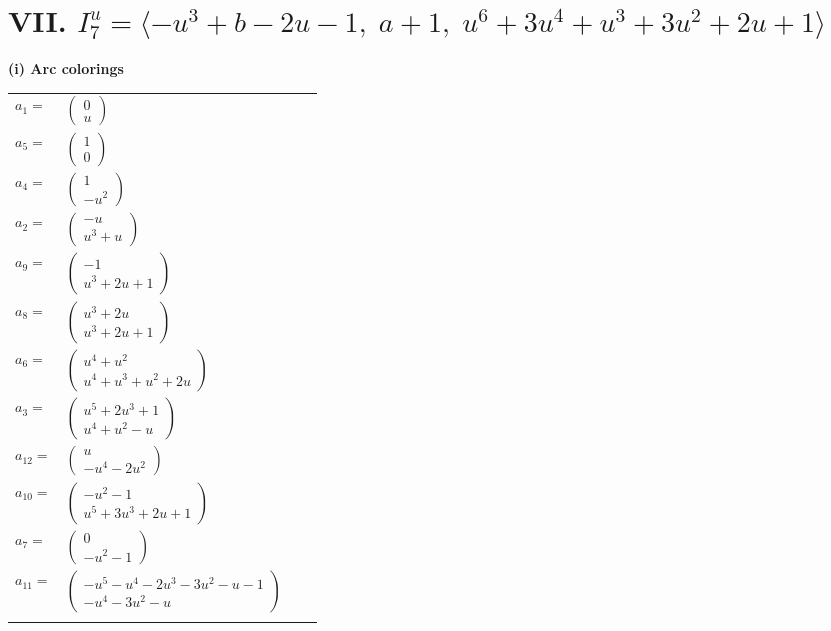 \documentclass[1p]{elsarticle_modified}
\theoremstyle{definition}
\begin{document}
\centering \section*{VII. $I^u_{7}= \langle - u^3+b-2 u-1,\;a+1,\;u^6+3 u^4+u^3+3 u^2+2 u+1 \rangle$}
\flushleft \textbf{(i) Arc colorings}\\
\begin{tabular}{m{7pt} m{180pt} m{7pt} m{180pt} }
\flushright $a_{1}=$&$\begin{pmatrix}0\\u\end{pmatrix}$ \\
\flushright $a_{5}=$&$\begin{pmatrix}1\\0\end{pmatrix}$ \\
\flushright $a_{4}=$&$\begin{pmatrix}1\\- u^2\end{pmatrix}$ \\
\flushright $a_{2}=$&$\begin{pmatrix}- u\\u^3+u\end{pmatrix}$ \\
\flushright $a_{9}=$&$\begin{pmatrix}-1\\u^3+2 u+1\end{pmatrix}$ \\
\flushright $a_{8}=$&$\begin{pmatrix}u^3+2 u\\u^3+2 u+1\end{pmatrix}$ \\
\flushright $a_{6}=$&$\begin{pmatrix}u^4+u^2\\u^4+u^3+u^2+2 u\end{pmatrix}$ \\
\flushright $a_{3}=$&$\begin{pmatrix}u^5+2 u^3+1\\u^4+u^2- u\end{pmatrix}$ \\
\flushright $a_{12}=$&$\begin{pmatrix}u\\- u^4-2 u^2\end{pmatrix}$ \\
\flushright $a_{10}=$&$\begin{pmatrix}- u^2-1\\u^5+3 u^3+2 u+1\end{pmatrix}$ \\
\flushright $a_{7}=$&$\begin{pmatrix}0\\- u^2-1\end{pmatrix}$ \\
\flushright $a_{11}=$&$\begin{pmatrix}- u^5- u^4-2 u^3-3 u^2- u-1\\- u^4-3 u^2- u\end{pmatrix}$\\&\end{tabular}
\end{document}
